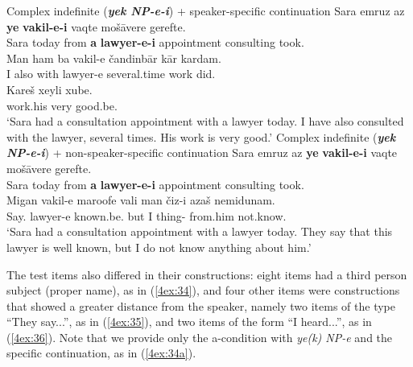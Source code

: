 \documentclass[output=paper]{langsci/langscibook}
\begin{document}
\begin{exe}
\begin{xlista}
	\ex\label{4ex:34c}
	Complex indefinite ({\bf\emph{yek NP-e-i}}) + speaker-specific continuation
	\exi{}
	\gll	Sara emruz	az	    	{\bf{ye}} {\bf{vakil-e-i}}	vaqte 		mošāvere	gerefte. \\
		Sara today	from 		{\bf{a}} {\bf{lawyer-e-i}} 	appointment	consulting		took.{} \\
	\glt 
	\exi{}
	\gll	Man ham ba	vakil-e    čandinbār  kār    kardam.   \\
		I       also with	lawyer-e several.time work did.{}  \\
	\glt	
	\exi{}
	\gll	Kareš   xeyli	xube. \\
		work.his very	good.be.{} \\
	\glt	`Sara had a consultation appointment with a lawyer today. I have also consulted with the lawyer, several times. His work is very good.'
	\ex\label{4ex:34d}
	Complex indefinite ({\bf\emph{yek NP-e-i}}) + non-speaker-specific continuation
	\exi{}
	\gll	Sara emruz az     {\bf{ye}} {\bf{vakil-e-i}}     vaqte 	           mošāvere gerefte. \\
		Sara  today from {\bf{a}}   {\bf{lawyer-e-i}}  appointment consulting  took.{} \\
	\glt
	\exi{}
	\gll	Migan    vakil-e	 maroofe	       vali	man čiz-i		       azaš      nemidunam. \\
		Say.{} lawyer-e known.be.{} but	I	   thing-{} from.him not.know.{} \\
	\glt	`{Sara had a consultation appointment with a lawyer today. They say that this lawyer is well known, but I do not know anything about him.}'
	\end{xlista}
\end{exe}

The test items also differed in their constructions: eight items had a third person subject (proper name), as in (\ref{4ex:34}), and four other items were constructions that showed a greater distance from the speaker, namely two items of the type ``They say...'', as in (\ref{4ex:35}), and two items of the form ``I heard...'', as in (\ref{4ex:36}). Note that we provide only the a-condition with {\emph{ye(k) NP-e}} and the specific continuation, as in (\ref{4ex:34a}).
\end{document}
